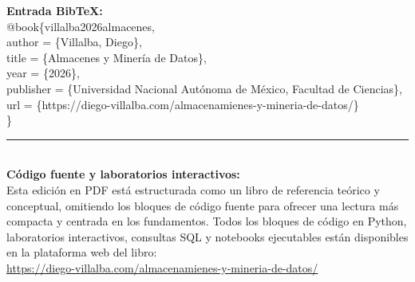 \textbf{Entrada BibTeX:}\\
{\small\ttfamily
@book\{villalba2026almacenes,\\
\hspace*{1.5em}author    = \{Villalba, Diego\},\\
\hspace*{1.5em}title     = \{Almacenes y Minería de Datos\},\\
\hspace*{1.5em}year      = \{2026\},\\
\hspace*{1.5em}publisher = \{Universidad Nacional Autónoma de México, Facultad de Ciencias\},\\
\hspace*{1.5em}url       = \{https://diego-villalba.com/almacenamienes-y-mineria-de-datos/\}\\
\}
}\\[1em]
\rule{\linewidth}{0.5pt}\\[0.8em]
\textbf{Código fuente y laboratorios interactivos:}\\[0.4em]
{\small Esta edición en PDF está estructurada como un libro de referencia teórico y conceptual, omitiendo los bloques de código fuente para ofrecer una lectura más compacta y centrada en los fundamentos. Todos los bloques de código en Python, laboratorios interactivos, consultas SQL y notebooks ejecutables están disponibles en la plataforma web del libro:}\\[0.4em]
{\small\url{https://diego-villalba.com/almacenamienes-y-mineria-de-datos/}}
\vspace*{\fill}
\clearpage
